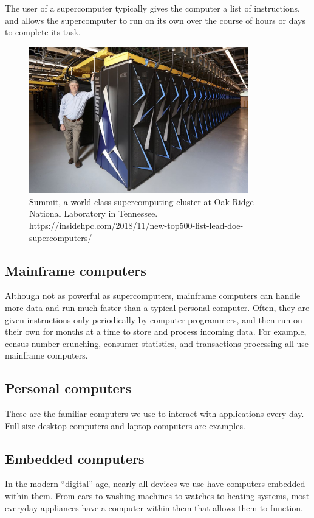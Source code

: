 The user of a supercomputer typically gives the computer a list of instructions, and allows the supercomputer to run on its own over the course of hours or days to complete its task.

\begin{figure}
	\centering
	\includegraphics[width=0.85\textwidth]{images/supercomputer.jpg}
	\caption{Summit, a world-class supercomputing cluster at Oak Ridge National Laboratory in Tennessee. https://insidehpc.com/2018/11/new-top500-list-lead-doe-supercomputers/}
	\label{fig:supercomputer}
\end{figure}

\subsection{Mainframe computers}
Although not as powerful as supercomputers, mainframe computers can handle more data and run much faster than a typical personal computer. Often, they are given instructions only periodically by computer programmers, and then run on their own for months at a time to store and process incoming data. For example, census number-crunching, consumer statistics, and transactions processing all use mainframe computers.

\subsection{Personal computers}
These are the familiar computers we use to interact with applications every day. Full-size desktop computers and laptop computers are examples.

\subsection{Embedded computers}
In the modern ``digital'' age, nearly all devices we use have computers embedded within them. From cars to washing machines to watches to heating systems, most everyday appliances have a computer within them that allows them to function.

